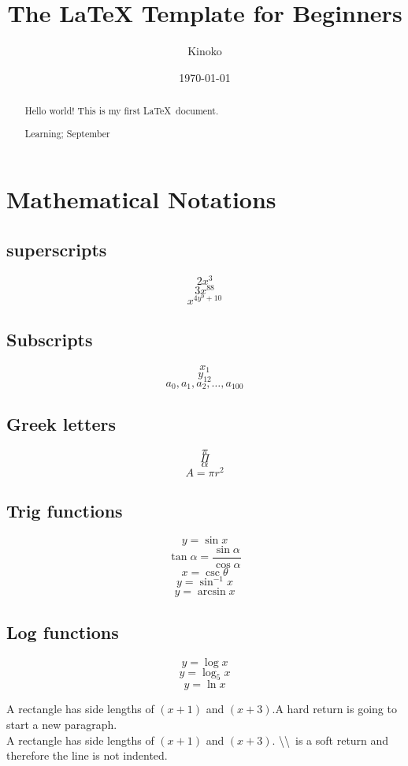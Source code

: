 \documentclass[12pt]{article}
\title{The LaTeX Template for Beginners}
\author{Kinoko}
\date{\today}
\begin{document}
\maketitle

\begin{abstract}
    Hello world! This is my first \LaTeX\ document. 

    \lipsum[1]

    \begin{keywords}
    Learning; September
    \end{keywords}
\end{abstract}
\newpage
\tableofcontents
\newpage

\section{Mathematical Notations}
\subsection{superscripts} 
$$2x^3$$
$$3x^{88}$$
$$x^{4y^9+10}$$

\subsection{Subscripts}
$$x_1$$
$$y_{12}$$
$$a_0,a_1,a_2,\dots,a_{100}$$

\subsection{Greek letters}
$$\pi$$
$$\Pi$$
$$\alpha$$
$$A=\pi r^2$$

\subsection{Trig functions}
$$y=\sin x$$
$$\tan \alpha=\frac{\sin \alpha}{\cos \alpha}$$
$$x=\csc \theta$$
$$y=\sin^{-1}x$$
$$y=\arcsin x$$

\subsection{Log functions}
$$y=\log x$$
$$y=\log_5  x$$
$$y=\ln x$$



A rectangle has side lengths of $(x+1)$ and $(x+3)$.A hard return is going to start a new paragraph.\\
A rectangle has side lengths of $(x+1)$ and $(x+3)$. \textbackslash\textbackslash\ is a soft return and therefore the line is not indented.
\end{document}
